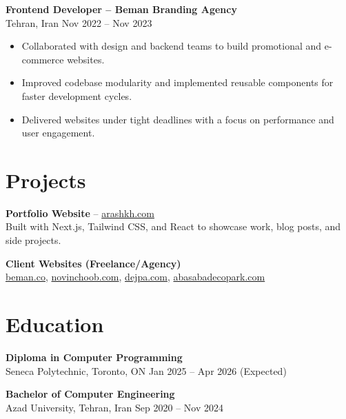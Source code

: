 \documentclass[letterpaper,11pt]{article}
\begin{document}
\textbf{Frontend Developer – Beman Branding Agency}\\
Tehran, Iran \hfill Nov 2022 -- Nov 2023
\begin{itemize}[leftmargin=*]
  \item Collaborated with design and backend teams to build promotional and e-commerce websites.
  \item Improved codebase modularity and implemented reusable components for faster development cycles.
  \item Delivered websites under tight deadlines with a focus on performance and user engagement.
\end{itemize}

\section*{Projects}
\textbf{Portfolio Website} – \href{https://arashkh.com}{arashkh.com}\\
Built with Next.js, Tailwind CSS, and React to showcase work, blog posts, and side projects.

\textbf{Client Websites (Freelance/Agency)}\\
\href{https://beman.co}{beman.co}, \href{https://novinchoob.com/en-us/}{novinchoob.com}, \href{https://dejpa.com}{dejpa.com}, \href{https://www.abasabadecopark.com}{abasabadecopark.com}

\section*{Education}
\textbf{Diploma in Computer Programming}\\
Seneca Polytechnic, Toronto, ON \hfill Jan 2025 -- Apr 2026 (Expected)

\textbf{Bachelor of Computer Engineering}\\
Azad University, Tehran, Iran \hfill Sep 2020 -- Nov 2024
\end{document}
